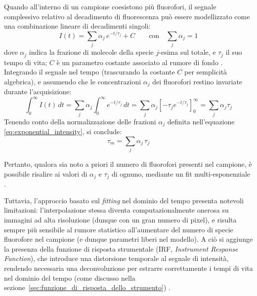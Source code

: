 Quando all'interno di un campione coesistono più fluorofori, il segnale complessivo relativo al decadimento di fluorescenza può essere modellizzato come una combinazione lineare di decadimenti singoli:
\begin{equation}
    I(t)=\sum_{j}\alpha_j\,e^{-t/\tau_j}+C \qquad \text{con} \quad \sum_{j} \alpha_j = 1
    \label{eq:exponential_intensity}
\end{equation}
dove $\alpha_j$ indica la frazione di molecole della specie $j$-esima sul totale, e $\tau_j$ il suo tempo di vita; $C$ è un parametro costante associato al rumore di fondo \cite{huComparisonPhasorAnalysis2023}.\\
Integrando il segnale nel tempo (trascurando la costante $C$ per semplicità algebrica), e assumendo che le concentrazioni $\alpha_j$ dei fluorofori restino invariate durante l'acquisizione:
\begin{equation*}
    \int_{0}^{\infty} I(t)\,dt = \sum_{j} \alpha_j \int_{0}^{\infty} e^{-t/\tau_j}\,dt = \sum_{j} \alpha_j \left[ -\tau_j e^{-t/\tau_j} \right]_0^\infty = \sum_{j} \alpha_j \tau_j
\end{equation*}
Tenendo conto della normalizzazione delle frazioni $\alpha_j$ definita nell'equazione \ref{eq:exponential_intensity}, si conclude:
\begin{equation}
    \tau_m = \sum_{j}\alpha_j\,\tau_j
    \label{eq:tau_medio}
\end{equation}

\noindent Pertanto, qualora sia noto a priori il numero di fluorofori presenti nel campione, è possibile risalire ai valori di $\alpha_j$ e $\tau_j$ di ognuno, mediante un fit multi-esponenziale \cite{lakowiczPrinciplesFluorescenceSpectroscopy2006}.

Tuttavia, l'approccio basato sul \textit{fitting} nel dominio del tempo presenta notevoli limitazioni: l'interpolazione stessa diventa computazionalmente onerosa su immagini ad alta risoluzione (dunque con un gran numero di pixel), e risulta sempre più sensibile al rumore statistico all'aumentare del numero di specie fluorofore nel campione (e dunque parametri liberi nel modello). A ciò si aggiunge la presenza della funzione di risposta strumentale (IRF, \textit{Instrument Response Function}), che introduce una distorsione temporale al segnale di intensità, rendendo necessaria una deconvoluzione per estrarre correttamente i tempi di vita nel dominio del tempo (come discusso nella sezione~\ref{sec:funzione_di_risposta_dello_strumento}) \cite{huComparisonPhasorAnalysis2023}.


